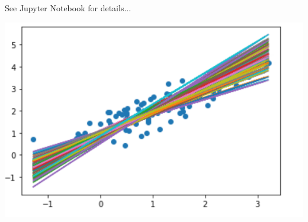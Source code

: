 See Jupyter Notebook for details...
\begin{center}
    \includegraphics[scale=0.5]{Outputs/Exo_5.png}
\end{center}
